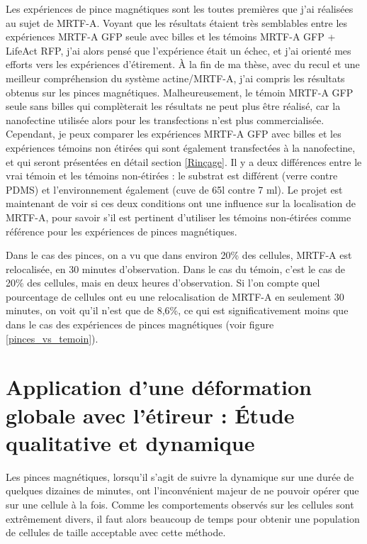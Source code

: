 Les expériences de pince magnétiques sont les toutes premières que j'ai réalisées au sujet de MRTF-A. Voyant que les résultats étaient très semblables entre les expériences MRTF-A GFP seule avec billes et les témoins MRTF-A GFP + LifeAct RFP, j'ai alors pensé que l'expérience était un échec, et j'ai orienté mes efforts vers les expériences d'étirement. À la fin de ma thèse, avec du recul et une meilleur compréhension du système actine/MRTF-A, j'ai compris les résultats obtenus sur les pinces magnétiques. Malheureusement, le témoin MRTF-A GFP seule sans billes qui complèterait les résultats ne peut plus être réalisé, car la nanofectine utilisée alors pour les transfections n'est plus commercialisée. Cependant, je peux comparer les expériences MRTF-A GFP avec billes et les expériences témoins non étirées qui sont également transfectées à la nanofectine, et qui seront présentées en détail section \ref{Rinçage}. Il y a deux différences entre le vrai témoin et les témoins non-étirées : le substrat est différent (verre contre PDMS) et l'environnement également (cuve de 65\micro l contre 7 ml). Le projet est maintenant de voir si ces deux conditions ont une influence sur la localisation de MRTF-A, pour savoir s'il est pertinent d'utiliser les témoins non-étirées comme référence pour les expériences de pinces magnétiques. 

Dans le cas des pinces, on a vu que dans environ 20\% des cellules, MRTF-A est relocalisée, en 30 minutes d'observation. Dans le cas du témoin, c'est le cas de 20\% des cellules, mais en deux heures d'observation. Si l'on compte quel pourcentage de cellules ont eu une relocalisation de MRTF-A en seulement 30 minutes, on voit qu'il n'est que de 8,6\%, ce qui est significativement moins que dans le cas des expériences de pinces magnétiques (voir figure \ref{pinces_vs_temoin}).








\section{Application d'une déformation globale avec l'étireur : \'Etude qualitative et dynamique}

Les pinces magnétiques, lorsqu'il s'agit de suivre la dynamique sur une durée de quelques dizaines de minutes, ont l'inconvénient majeur de ne pouvoir opérer que sur une cellule à la fois. Comme les comportements observés sur les cellules sont extrêmement divers, il faut alors beaucoup de temps pour obtenir une population de cellules de taille acceptable avec cette méthode. 


